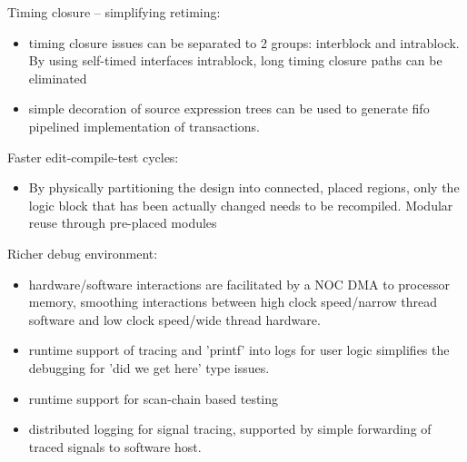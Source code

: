 Timing closure -- simplifying retiming:
\begin{itemize}
\item timing closure issues
can be separated to 2 groups: interblock and intrablock.
By using self-timed interfaces intrablock, long timing closure paths can be eliminated
\item simple decoration of source expression trees can be used to generate
fifo pipelined implementation of transactions.
\end{itemize}

Faster edit-compile-test cycles:
\begin{itemize}
\item By physically partitioning the design into connected, placed regions, only the
logic block that has been actually changed needs to be recompiled.  Modular reuse through pre-placed modules
\end{itemize}

Richer debug environment:
\begin{itemize}
\item hardware/software interactions are facilitated by a NOC DMA to processor memory,
smoothing interactions between high clock speed/narrow thread software and low clock
speed/wide thread hardware.
\item runtime support of tracing and 'printf' into logs for user logic simplifies the debugging for 'did we get here' type issues.
\item runtime support for scan-chain based testing
\item distributed logging for signal tracing, supported by simple forwarding of traced signals to software host.
\end{itemize}





